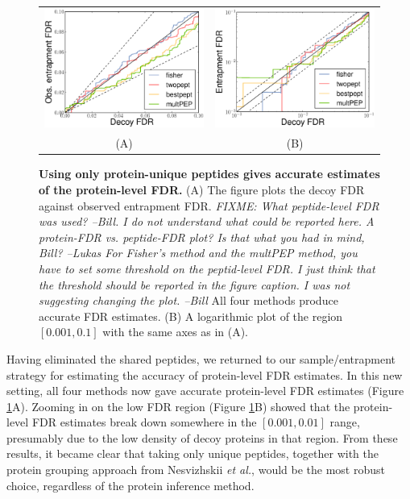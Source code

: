 \documentclass{article}
\begin{document}
\begin{figure}
\begin{center}
\begin{tabular}{cc} 
\includegraphics[width=0.45\linewidth]{./img/unique-pept-accuracy} &
\includegraphics[width=0.45\linewidth]{./img/unique-pept-accuracy-log}
\\
(A) & (B)
\end{tabular}
\caption{\label{fig:unique-accuracy}\textbf{Using only protein-unique
    peptides gives accurate estimates of the protein-level FDR.}  (A)
  The figure plots the decoy FDR against observed entrapment FDR.
  {\em FIXME: What peptide-level FDR was used? --Bill. I do not
    understand what could be reported here. A protein-FDR
    vs. peptide-FDR plot? Is that what you had in mind, Bill? --Lukas
    For Fisher's method and the multPEP method, you have to set some
    threshold on the peptid-level FDR.  I just think that the
    threshold should be reported in the figure caption. I was not
    suggesting changing the plot.  --Bill} All four methods produce
  accurate FDR estimates. (B) A logarithmic plot of the region
  $[0.001, 0.1]$ with the same axes as in (A).}
\end{center}
\end{figure}

Having eliminated the shared peptides, we returned to our
sample/entrapment strategy for estimating the accuracy of
protein-level FDR estimates.  In this new setting, all four methods
now gave accurate protein-level FDR estimates (Figure
\ref{fig:unique-accuracy}A).  Zooming in on the low FDR region (Figure
\ref{fig:unique-accuracy}B) showed that the protein-level FDR
estimates break down somewhere in the $[0.001, 0.01]$ range,
presumably due to the low density of decoy proteins in that region.
From these results, it became clear that taking only unique peptides,
together with the protein grouping approach from Nesvizhskii {\em et
  al.}, would be the most robust choice, regardless of the protein
inference method.
\end{document}
